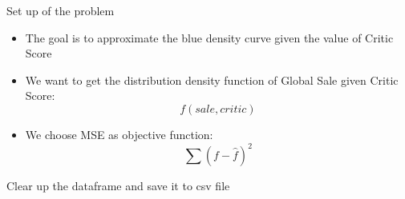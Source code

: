 \documentclass[ignorenonframetext,]{beamer}
\providecommand{\tightlist}{%
  \setlength{\itemsep}{0pt}\setlength{\parskip}{0pt}}
\begin{document}
\begin{frame}{Set up of the problem}
\protect\hypertarget{set-up-of-the-problem}{}

\begin{itemize}
\tightlist
\item
  The goal is to approximate the blue density curve given the value of
  Critic Score
\item
  We want to get the distribution density function of Global Sale given
  Critic Score: \[f(sale, critic)\]
\item
  We choose MSE as objective function: \[\sum(f-\hat f)^2\]
\end{itemize}

\end{frame}

\begin{frame}[fragile]{Clear up the dataframe and save it to csv file}
\protect\hypertarget{clear-up-the-dataframe-and-save-it-to-csv-file}{}


\end{frame}
\end{document}
